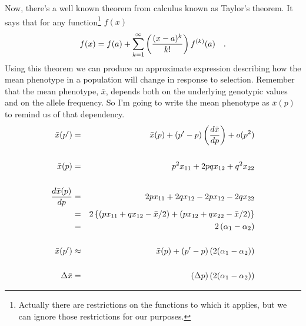 Now, there's a well known theorem from calculus known as Taylor's
theorem. It says that for any function\footnote{Actually there are
  restrictions on the functions to which it applies, but we can ignore
  those restrictions for our purposes.} $f(x)$
\[
f(x) = f(a) + \sum_{k=1}^\infty \left({{(x-a)^k} \over k!}\right)
                                 f^{(k)}(a) \quad .
\]
Using this theorem we can produce an approximate expression describing
how the mean phenotype in a population will change in response to
selection. Remember that the mean phenotype, $\bar x$, depends both on
the underlying genotypic values and on the allele frequency. So I'm
going to write the mean phenotype as $\bar x(p)$ to remind us of that
dependency.
\begin{eqnarray*}
{\bar x}(p') &=& {\bar x}(p) + (p' - p)\left({d{\bar x} \over dp}\right)
             + o(p^2) \\
\\
{\bar x}(p) &=& p^2x_{11} + 2pqx_{12} + q^2x_{22} \\
\\
\frac{d{\bar x(p)}}{dp}
         &=& 2px_{11} + 2qx_{12} - 2px_{12} - 2qx_{22} \\
         &=& 2\left\{
             \left(px_{11} + qx_{12} - {\bar x}/2\right) +
             \left(px_{12} + qx_{22} - {\bar x}/2\right)\right\} \\
         &=& 2\left(\alpha_1 - \alpha_2\right) \\
\\
{\bar x}(p') &\approx& {\bar x}(p) + (p' - p)\left(2(\alpha_1 - \alpha_2)\right) \\
\\
\Delta{\bar x} &=& (\Delta p)\left(2(\alpha_1 - \alpha_2)\right)
\end{eqnarray*}

